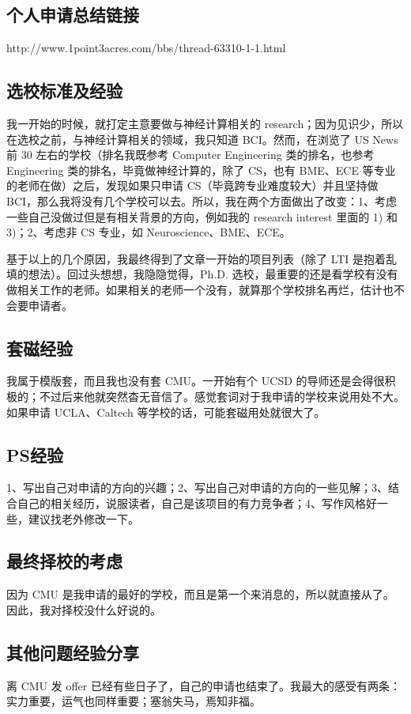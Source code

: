 \documentclass[11pt,fleqn,openany]{book} %
\begin{document}
\subsection*{个人申请总结链接}
http://www.1point3acres.com/bbs/thread-63310-1-1.html
\subsection*{选校标准及经验}
我一开始的时候，就打定主意要做与神经计算相关的 research；因为见识少，所以在选校之前，与神经计算相关的领域，我只知道 BCI。然而，在浏览了 US News 前 30 左右的学校（排名我既参考 Computer Engineering 类的排名，也参考 Engineering 类的排名，毕竟做神经计算的，除了 CS，也有 BME、ECE 等专业的老师在做）之后，发现如果只申请 CS（毕竟跨专业难度较大）并且坚持做 BCI，那么我将没有几个学校可以去。所以，我在两个方面做出了改变：1、考虑一些自己没做过但是有相关背景的方向，例如我的 research interest 里面的 1) 和 3)；2、考虑非 CS 专业，如 Neuroscience、BME、ECE。

基于以上的几个原因，我最终得到了文章一开始的项目列表（除了 LTI 是抱着乱填的想法）。回过头想想，我隐隐觉得，Ph.D. 选校，最重要的还是看学校有没有做相关工作的老师。如果相关的老师一个没有，就算那个学校排名再烂，估计也不会要申请者。
\subsection*{套磁经验}
我属于模版套，而且我也没有套 CMU。一开始有个 UCSD 的导师还是会得很积极的；不过后来他就突然杳无音信了。感觉套词对于我申请的学校来说用处不大。如果申请 UCLA、Caltech 等学校的话，可能套磁用处就很大了。
\subsection*{PS经验}
1、写出自己对申请的方向的兴趣；2、写出自己对申请的方向的一些见解；3、结合自己的相关经历，说服读者，自己是该项目的有力竞争者；4、写作风格好一些，建议找老外修改一下。
\subsection*{最终择校的考虑}
因为 CMU 是我申请的最好的学校，而且是第一个来消息的，所以就直接从了。因此，我对择校没什么好说的。
\subsection*{其他问题经验分享}
离 CMU 发 offer 已经有些日子了，自己的申请也结束了。我最大的感受有两条：实力重要，运气也同样重要；塞翁失马，焉知非福。
\end{document}
